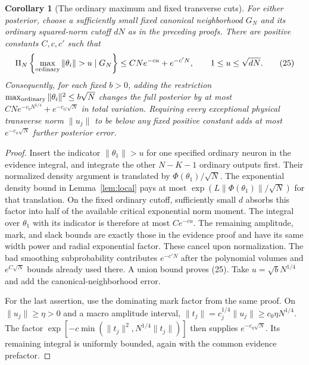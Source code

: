 \documentclass[11pt]{article}
\newtheorem{corollary}[theorem]{Corollary}
\begin{document}
\begin{corollary}[The ordinary maximum and fixed transverse cuts]
For either posterior, choose a sufficiently small fixed canonical
neighborhood $G_N$ and its ordinary squared-norm cutoff $dN$ as in the
preceding proofs. There are positive constants $C,c,c'$ such that
\[
 \Pi_N\left\{\max_{\rm ordinary}\|\theta_i\|>u\mid G_N\right\}
                  \le CN e^{-cu}+e^{-c'N},
       \qquad 1\le u\le\sqrt{dN}.                       \tag{25}
\]
Consequently, for each fixed $b>0$, adding the restriction
$\max_{\rm ordinary}\|\theta_i\|^2\le b\sqrt N$ changes the full
posterior by at most $CN e^{-c_bN^{1/4}}+e^{-c_G\sqrt N}$ in total
variation. Requiring every exceptional physical transverse norm
$\|u_j\|$ to be below any fixed positive constant adds at most
$e^{-c_u\sqrt N}$ further posterior error.
\end{corollary}
\begin{proof}
Insert the indicator $\|\theta_1\|>u$ for one specified ordinary neuron
in the evidence integral, and integrate the other $N-K-1$ ordinary
outputs first. Their normalized density argument is translated by
$\Phi(\theta_1)/\sqrt N$. The exponential density bound in
Lemma~\ref{lem:local} pays at most
$\exp(L\|\Phi(\theta_1)\|/\sqrt N)$ for that translation.
On the fixed ordinary cutoff, sufficiently small $d$ absorbs this
factor into half of the available critical exponential norm moment.
The integral over $\theta_1$ with its indicator is therefore at most
$Ce^{-cu}$. The remaining amplitude, mark, and slack bounds are exactly
those in the evidence proof and have its same width power and radial
exponential factor. These cancel upon normalization. The bad smoothing
subprobability contributes $e^{-c'N}$ after the polynomial volumes and
$e^{C\sqrt N}$ bounds already used there. A union bound proves (25).
Take $u=\sqrt b N^{1/4}$ and add the canonical-neighborhood error.

For the last assertion, use the dominating mark factor from the same
proof. On $\|u_j\|\ge\eta>0$ and a macro amplitude interval,
$\|t_j\|=c_j^{1/4}\|u_j\|\ge c_0\eta N^{1/4}$.
The factor
$\exp[-c\min(\|t_j\|^2,N^{1/4}\|t_j\|)]$ then supplies
$e^{-c_\eta\sqrt N}$. Its remaining integral is uniformly bounded,
again with the common evidence prefactor.
\end{proof}
\end{document}

